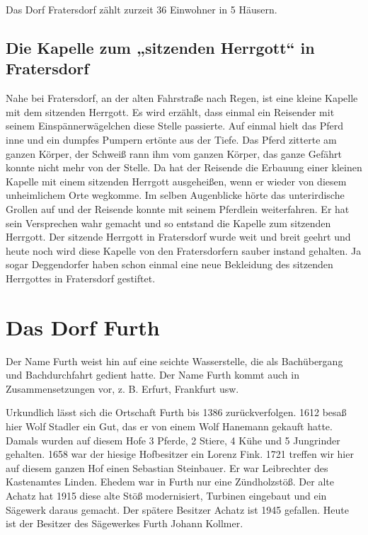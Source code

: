 \documentclass{book}
\begin{document}
Das Dorf Fratersdorf zählt zurzeit 36 Einwohner in 5 Häusern.

\subsection{Die Kapelle zum „sitzenden Herrgott“ in Fratersdorf}

Nahe bei Fratersdorf, an der alten Fahrstraße nach Regen, ist eine
kleine Kapelle mit dem sitzenden Herrgott. Es wird erzählt, dass einmal
ein Reisender mit seinem Einspännerwägelchen diese Stelle passierte. Auf
einmal hielt das Pferd inne und ein dumpfes Pumpern ertönte aus der
Tiefe. Das Pferd zitterte am ganzen Körper, der Schweiß rann ihm vom
ganzen Körper, das ganze Gefährt konnte nicht mehr von der Stelle. Da
hat der Reisende die Erbauung einer kleinen Kapelle mit einem sitzenden
Herrgott ausgeheißen, wenn er wieder von diesem unheimlichem Orte
wegkomme. Im selben Augenblicke hörte das unterirdische Grollen auf und
der Reisende konnte mit seinem Pferdlein weiterfahren. Er hat sein
Versprechen wahr gemacht und so entstand die Kapelle zum sitzenden
Herrgott. Der sitzende Herrgott in Fratersdorf wurde weit und breit
geehrt und heute noch wird diese Kapelle von den Fratersdorfern sauber
instand gehalten. Ja sogar Deggendorfer haben schon einmal eine neue
Bekleidung des sitzenden Herrgottes in Fratersdorf gestiftet.

\section{Das Dorf Furth}

Der Name Furth weist hin auf eine seichte Wasserstelle, die als
Bachübergang und Bachdurchfahrt gedient hatte. Der Name Furth kommt auch
in Zusammensetzungen vor, z. B. Erfurt, Frankfurt usw.

Urkundlich lässt sich die Ortschaft Furth bis 1386 zurückverfolgen. 1612
besaß hier Wolf Stadler ein Gut, das er von einem Wolf Hanemann gekauft
hatte. Damals wurden auf diesem Hofe 3 Pferde, 2 Stiere, 4 Kühe und 5
Jungrinder gehalten. 1658 war der hiesige Hofbesitzer ein Lorenz Fink.
1721 treffen wir hier auf diesem ganzen Hof einen Sebastian Steinbauer.
Er war Leibrechter des Kastenamtes Linden. Ehedem war in Furth nur eine
Zündholzstöß. Der alte Achatz hat 1915 diese alte Stöß modernisiert,
Turbinen eingebaut und ein Sägewerk daraus gemacht. Der spätere Besitzer
Achatz ist 1945 gefallen. Heute ist der Besitzer des Sägewerkes Furth
Johann Kollmer.
\end{document}
